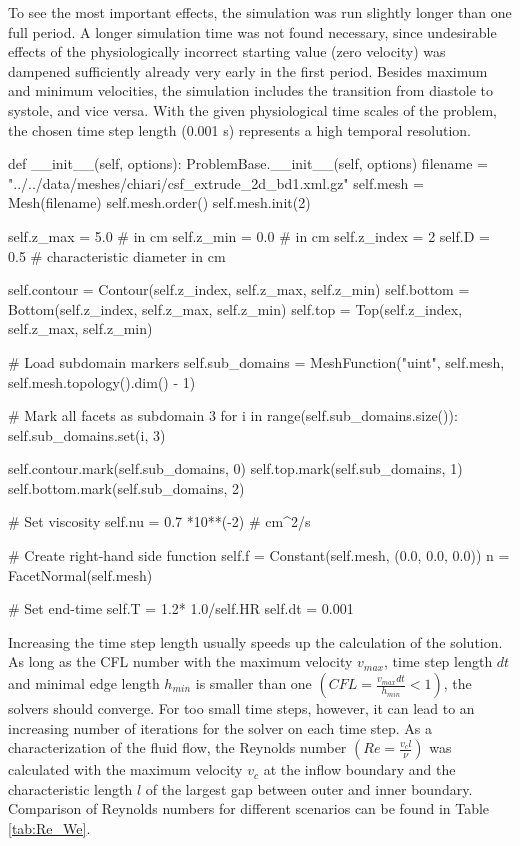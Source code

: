 To see the most important effects, the simulation was run slightly longer than one full period. A longer simulation time was not found necessary, since undesirable effects of the physiologically incorrect starting value (zero velocity) was dampened sufficiently already very early in the first period. Besides maximum and minimum velocities, the simulation includes the transition from diastole to systole, and vice versa.  With the given physiological time scales of the problem, the chosen time step length (0.001 s) represents a high temporal resolution.
\begin{python}
def __init__(self, options):
	ProblemBase.__init__(self, options)
	filename = "../../data/meshes/chiari/csf_extrude_2d_bd1.xml.gz"
	self.mesh = Mesh(filename)
	self.mesh.order()
	self.mesh.init(2)

	self.z_max = 5.0	# in cm
	self.z_min = 0.0	# in cm
	self.z_index = 2
	self.D = 0.5 		# characteristic diameter in cm

	self.contour = Contour(self.z_index, self.z_max, self.z_min)
	self.bottom = Bottom(self.z_index, self.z_max, self.z_min)
	self.top = Top(self.z_index, self.z_max, self.z_min)

    # Load subdomain markers
	self.sub_domains =  MeshFunction("uint", self.mesh, self.mesh.topology().dim() - 1)

	# Mark all facets as subdomain 3
	for i in range(self.sub_domains.size()):
		self.sub_domains.set(i, 3)

	self.contour.mark(self.sub_domains, 0)
	self.top.mark(self.sub_domains, 1)
	self.bottom.mark(self.sub_domains, 2)

    # Set viscosity
	self.nu = 0.7 *10**(-2) # cm^2/s

    # Create right-hand side function
	self.f = Constant(self.mesh, (0.0, 0.0, 0.0))
	n = FacetNormal(self.mesh)

    # Set end-time
	self.T = 1.2* 1.0/self.HR
	self.dt = 0.001
\end{python}

Increasing the time step length usually speeds up the calculation of
the solution. As long as the CFL number with the maximum velocity
$v_{max}$, time step length $dt$ and minimal edge length $h_{min}$ is
smaller than one $(CFL = \frac{v_{max} dt}{h_{min}} < 1)$, the solvers
should converge. For too small time steps, however, it can lead to
an increasing number of iterations for the solver on each time step.
As a characterization of the fluid flow, the Reynolds number $(Re =
\frac{v_c l}{\nu})$ was calculated with the maximum velocity $v_c$ at
the inflow boundary and the characteristic length $l$ of the largest
gap between outer and inner boundary. Comparison of Reynolds numbers
for different scenarios can be found in Table \ref{tab:Re_We}.

